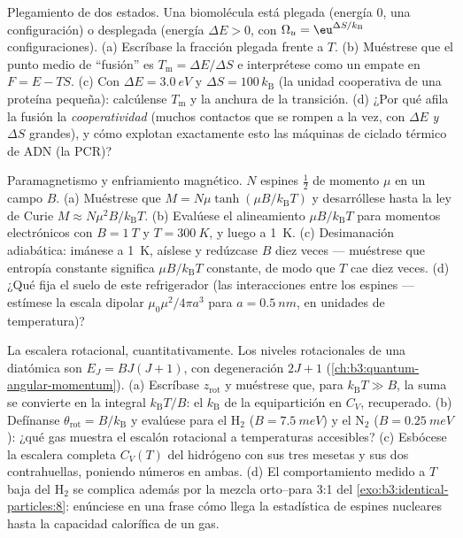 \begin{exercise}[$\star\star\star$]\label{exo:b3:canonical-ensemble:10}
Plegamiento de dos estados. Una biomolécula está plegada (energía $0$, una
configuración) o desplegada (energía $\Delta E > 0$, con $\Omega_u =
\eu^{\Delta S/k_{\text{B}}}$ configuraciones). (a) Escríbase la fracción
plegada frente a $T$. (b) Muéstrese que el punto medio de ``fusión'' es
$T_{\text{m}} = \Delta E/\Delta S$ e interprétese como un empate en $F = E -
TS$. (c) Con $\Delta E = \qty{3.0}{eV}$ y $\Delta S =
100\,k_{\text{B}}$ (la unidad cooperativa de una proteína pequeña): calcúlense
$T_{\text{m}}$ y la anchura de la transición. (d) ¿Por qué afila la fusión
la \emph{cooperatividad} (muchos contactos que se rompen a la vez, con
$\Delta E$ \emph{y} $\Delta S$ grandes), y cómo explotan exactamente esto
las máquinas de ciclado térmico de ADN (la PCR)?
\end{exercise}

\begin{exercise}[$\star\star\star$]\label{exo:b3:canonical-ensemble:11}
Paramagnetismo y enfriamiento magnético. $N$ espines $\tfrac12$ de momento
$\mu$ en un campo $B$. (a) Muéstrese que $M = N\mu\tanh(\mu B/k_{\text{B}}T)$
y desarróllese hasta la ley de Curie $M \approx N\mu^2B/k_{\text{B}}T$. (b)
Evalúese el alineamiento $\mu B/k_{\text{B}}T$ para momentos electrónicos
con $B = \qty{1}{T}$ y $T = \qty{300}{K}$, y luego a \qty{1}{K}. (c)
Desimanación adiabática: imánese a \qty{1}{K}, aíslese y
redúzcase $B$ diez veces --- muéstrese que entropía constante significa
$\mu B/k_{\text{B}}T$ constante, de modo que $T$ cae diez veces. (d) ¿Qué
fija el suelo de este refrigerador (las interacciones entre los espines ---
estímese la escala dipolar $\mu_0\mu^2/4\pi a^3$ para $a =
\qty{0.5}{nm}$, en unidades de temperatura)?
\end{exercise}

\begin{exercise}[$\star\star\star$]\label{exo:b3:canonical-ensemble:12}
La escalera rotacional, cuantitativamente. Los niveles rotacionales de una
diatómica son $E_J = BJ(J+1)$, con degeneración $2J + 1$
(\cref{ch:b3:quantum-angular-momentum}). (a) Escríbase $z_{\text{rot}}$
y muéstrese que, para $k_{\text{B}}T \gg B$, la suma se convierte en la
integral $k_{\text{B}}T/B$: el $k_{\text{B}}$ de la equipartición en
$C_V$, recuperado. (b) Defínanse $\theta_{\text{rot}} =
B/k_{\text{B}}$ y evalúese para el H$_2$ ($B = \qty{7.5}{meV}$) y el
N$_2$ ($B = \qty{0.25}{meV}$): ¿qué gas muestra el escalón rotacional
a temperaturas accesibles? (c) Esbócese la escalera completa $C_V(T)$ del
hidrógeno con sus tres mesetas y sus dos contrahuellas, poniendo números
en ambas. (d) El comportamiento medido a $T$ baja del H$_2$ se complica
además por la mezcla orto--para 3:1 del
\cref{exo:b3:identical-particles:8}: enúnciese en una frase cómo llega la
estadística de espines nucleares hasta la capacidad calorífica de un gas.
\end{exercise}

